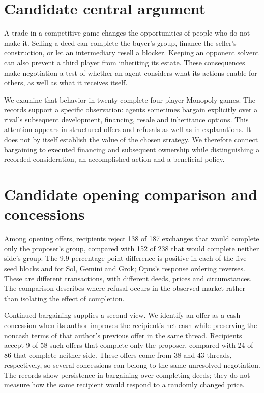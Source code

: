 
\section*{Candidate central argument}

A trade in a competitive game changes the opportunities of people who do not
make it. Selling a deed can complete the buyer's group, finance the seller's
construction, or let an intermediary resell a blocker. Keeping an opponent
solvent can also prevent a third player from inheriting its estate. These
consequences make negotiation a test of whether an agent considers what its
actions enable for others, as well as what it receives itself.

We examine that behavior in twenty complete four-player Monopoly games. The
records support a specific observation: agents sometimes bargain explicitly
over a rival's subsequent development, financing, resale and inheritance
options. This attention appears in structured offers and refusals as well as
in explanations. It does not by itself establish the value of the chosen
strategy. We therefore connect bargaining to executed financing and subsequent
ownership while distinguishing a recorded consideration, an accomplished
action and a beneficial policy.

\section*{Candidate opening comparison and concessions}

Among opening offers, recipients reject 138 of 187 exchanges that would
complete only the proposer's group, compared with 152 of 238 that would
complete neither side's group. The 9.9 percentage-point difference is
positive in each of the five seed blocks and for Sol, Gemini and Grok;
Opus's response ordering reverses. These are different transactions, with
different deeds, prices and circumstances. The comparison describes where
refusal occurs in the observed market rather than isolating the effect of
completion.

Continued bargaining supplies a second view. We identify an offer as a cash
concession when its author improves the recipient's net cash while preserving
the noncash terms of that author's previous offer in the same thread.
Recipients accept 9 of 58 such offers that complete only the proposer,
compared with 24 of 86 that complete neither side. These offers come from
38 and 43 threads, respectively, so several concessions can belong to the
same unresolved negotiation. The records show persistence in bargaining over
completing deeds; they do not measure how the same recipient would respond
to a randomly changed price.

